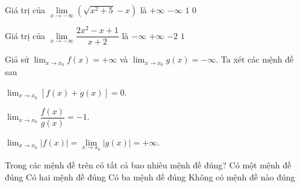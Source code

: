 \begin{ex}%
	Giá trị của $\lim \limits_{x \to  - \infty } \left( \sqrt {x^2 + 5}  - x \right)$ là
	\choice
	{\True $+\infty $}
	{$-\infty $}
	{$1$}
	{$0$}
\end{ex}

\begin{ex}%
	Giá trị của $\lim\limits_{x\to -\infty}\dfrac{2x^2-x+1}{x+2}$ là
	\choice
	{\True$-\infty $}
	{$+\infty $}
	{$-2$}
	{$1$}
\end{ex}

\begin{ex}%
	Giả sử $\displaystyle \lim_{x \rightarrow x_0} f(x) = +\infty$ và $\displaystyle \lim_{x \rightarrow x_0} g(x) = -\infty$. Ta xét các mệnh đề sau
	\begin{enumEX}[(1)]{3}
		\item $\displaystyle \lim_{x \rightarrow x_0} \left[f(x) + g(x)\right]  = 0$.
		\item $\displaystyle \lim_{x \rightarrow x_0} \dfrac{f(x)}{g(x)}  = -1$.
		\item $\displaystyle \lim_{x \rightarrow x_0} \left|f(x)\right|  = \lim\limits_{x\rightarrow x_0} \left|g(x)\right| = +\infty$.
	\end{enumEX}
	Trong các mệnh đề trên có tất cả bao nhiêu mệnh đề đúng?
	\choice
	{Có một mệnh đề đúng}
	{Có hai mệnh đề đúng}
	{Có ba mệnh đề đúng}
	{\True Không có mệnh đề nào đúng}
\end{ex}

